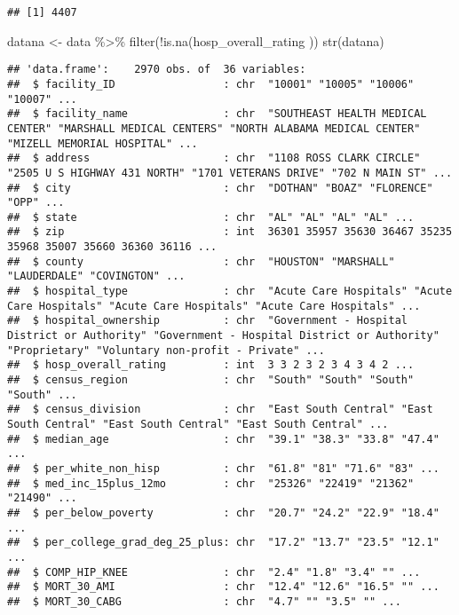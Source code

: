 \documentclass[
]{article}
\newenvironment{Shaded}{\begin{snugshade}}{\end{snugshade}}
\newcommand{\FunctionTok}[1]{\textcolor[rgb]{0.00,0.00,0.00}{#1}}
\newcommand{\NormalTok}[1]{#1}
\newcommand{\OtherTok}[1]{\textcolor[rgb]{0.56,0.35,0.01}{#1}}
\newcommand{\SpecialCharTok}[1]{\textcolor[rgb]{0.00,0.00,0.00}{#1}}
\begin{document}
\begin{verbatim}
## [1] 4407
\end{verbatim}

\begin{Shaded}
\begin{Highlighting}[]
\NormalTok{datana }\OtherTok{\textless{}{-}}\NormalTok{ data }\SpecialCharTok{\%\textgreater{}\%} \FunctionTok{filter}\NormalTok{(}\SpecialCharTok{!}\FunctionTok{is.na}\NormalTok{(hosp\_overall\_rating ))}
\FunctionTok{str}\NormalTok{(datana)}
\end{Highlighting}
\end{Shaded}

\begin{verbatim}
## 'data.frame':    2970 obs. of  36 variables:
##  $ facility_ID                 : chr  "10001" "10005" "10006" "10007" ...
##  $ facility_name               : chr  "SOUTHEAST HEALTH MEDICAL CENTER" "MARSHALL MEDICAL CENTERS" "NORTH ALABAMA MEDICAL CENTER" "MIZELL MEMORIAL HOSPITAL" ...
##  $ address                     : chr  "1108 ROSS CLARK CIRCLE" "2505 U S HIGHWAY 431 NORTH" "1701 VETERANS DRIVE" "702 N MAIN ST" ...
##  $ city                        : chr  "DOTHAN" "BOAZ" "FLORENCE" "OPP" ...
##  $ state                       : chr  "AL" "AL" "AL" "AL" ...
##  $ zip                         : int  36301 35957 35630 36467 35235 35968 35007 35660 36360 36116 ...
##  $ county                      : chr  "HOUSTON" "MARSHALL" "LAUDERDALE" "COVINGTON" ...
##  $ hospital_type               : chr  "Acute Care Hospitals" "Acute Care Hospitals" "Acute Care Hospitals" "Acute Care Hospitals" ...
##  $ hospital_ownership          : chr  "Government - Hospital District or Authority" "Government - Hospital District or Authority" "Proprietary" "Voluntary non-profit - Private" ...
##  $ hosp_overall_rating         : int  3 3 2 3 2 3 4 3 4 2 ...
##  $ census_region               : chr  "South" "South" "South" "South" ...
##  $ census_division             : chr  "East South Central" "East South Central" "East South Central" "East South Central" ...
##  $ median_age                  : chr  "39.1" "38.3" "33.8" "47.4" ...
##  $ per_white_non_hisp          : chr  "61.8" "81" "71.6" "83" ...
##  $ med_inc_15plus_12mo         : chr  "25326" "22419" "21362" "21490" ...
##  $ per_below_poverty           : chr  "20.7" "24.2" "22.9" "18.4" ...
##  $ per_college_grad_deg_25_plus: chr  "17.2" "13.7" "23.5" "12.1" ...
##  $ COMP_HIP_KNEE               : chr  "2.4" "1.8" "3.4" "" ...
##  $ MORT_30_AMI                 : chr  "12.4" "12.6" "16.5" "" ...
##  $ MORT_30_CABG                : chr  "4.7" "" "3.5" "" ...

\end{verbatim}
\end{document}
